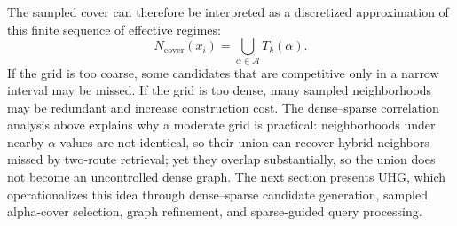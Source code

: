 The sampled cover can therefore be interpreted as a discretized approximation of this finite sequence of effective regimes:
\begin{equation}
    N_{\mathrm{cover}}(x_i)=\bigcup_{\alpha\in\mathcal{A}}T_k(\alpha).
    \label{eq:rigorous-sampled-alpha-cover}
\end{equation}
If the grid is too coarse, some candidates that are competitive only in a narrow interval may be missed. If the grid is too dense, many sampled neighborhoods may be redundant and increase construction cost. The dense--sparse correlation analysis above explains why a moderate grid is practical: neighborhoods under nearby $\alpha$ values are not identical, so their union can recover hybrid neighbors missed by two-route retrieval; yet they overlap substantially, so the union does not become an uncontrolled dense graph. The next section presents UHG, which operationalizes this idea through dense--sparse candidate generation, sampled alpha-cover selection, graph refinement, and sparse-guided query processing.
